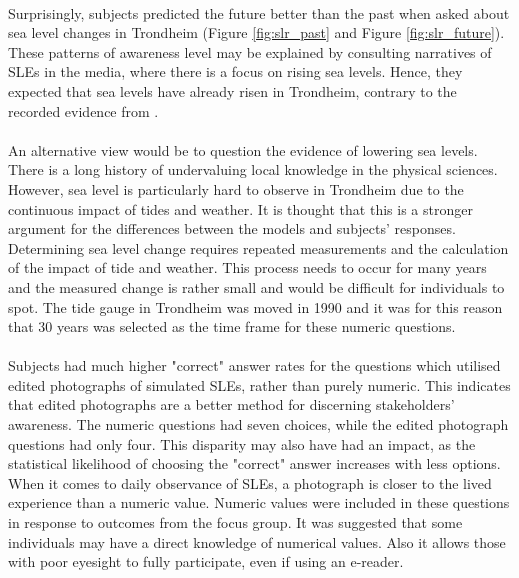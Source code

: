 \paragraph{}
Surprisingly, subjects predicted the future better than the past when asked about sea level changes in Trondheim (Figure \ref{fig:slr_past} and Figure \ref{fig:slr_future}). These patterns of awareness level may be explained by consulting narratives of SLEs in the media, where there is a focus on rising sea levels. Hence, they expected that sea levels have already risen in Trondheim, contrary to the recorded evidence from \cite{tides_high_2022}.


\paragraph{}
An alternative view would be to question the evidence of lowering sea levels. There is a long history of undervaluing local knowledge in the physical sciences. However, sea level is particularly hard to observe in Trondheim due to the continuous impact of tides and weather. It is thought that this is a stronger argument for the differences between the models and subjects' responses. Determining sea level change requires repeated measurements and the calculation of the impact of tide and weather. This process needs to occur for many years and the measured change is rather small and would be difficult for individuals to spot. The tide gauge in Trondheim was moved in 1990 and it was for this reason that 30 years was selected as the time frame for these numeric questions. 

\paragraph{}
Subjects had much higher "correct" answer rates for the questions which utilised edited photographs of simulated SLEs, rather than purely numeric. This indicates that edited photographs are a better method for discerning stakeholders' awareness. The numeric questions had seven choices, while the edited photograph questions had only four. This disparity may also have had an impact, as the statistical likelihood of choosing the "correct" answer increases with less options. When it comes to daily observance of SLEs, a photograph is closer to the lived experience than a numeric value. Numeric values were included in these questions in response to outcomes from the focus group. It was suggested that some individuals may have a direct knowledge of numerical values. Also it allows those with poor eyesight to fully participate, even if using an e-reader.
